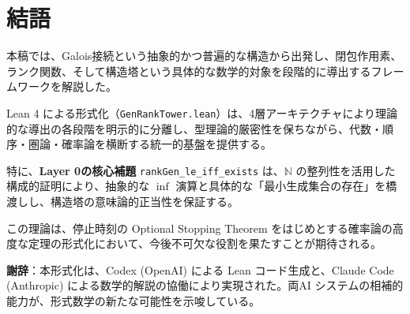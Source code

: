 \documentclass[a4paper,12pt]{ltjsarticle}
\newcommand{\N}{\mathbb{N}}
\newcommand{\Lean}[1]{\texttt{\color{blue}#1}}
\begin{document}
\section{結語}

本稿では、Galois接続という抽象的かつ普遍的な構造から出発し、閉包作用素、ランク関数、そして構造塔という具体的な数学的対象を段階的に導出するフレームワークを解説した。

Lean 4 による形式化（\texttt{GenRankTower.lean}）は、4層アーキテクチャにより理論的な導出の各段階を明示的に分離し、型理論的厳密性を保ちながら、代数・順序・圏論・確率論を横断する統一的基盤を提供する。

特に、\textbf{Layer 0の核心補題} \Lean{rankGen\_le\_iff\_exists} は、$\N$ の整列性を活用した構成的証明により、抽象的な $\inf$ 演算と具体的な「最小生成集合の存在」を橋渡しし、構造塔の意味論的正当性を保証する。

この理論は、停止時刻の Optional Stopping Theorem をはじめとする確率論の高度な定理の形式化において、今後不可欠な役割を果たすことが期待される。

\vspace{1em}
\noindent
\textbf{謝辞}：本形式化は、Codex (OpenAI) による Lean コード生成と、Claude Code (Anthropic) による数学的解説の協働により実現された。両AI システムの相補的能力が、形式数学の新たな可能性を示唆している。
\end{document}
